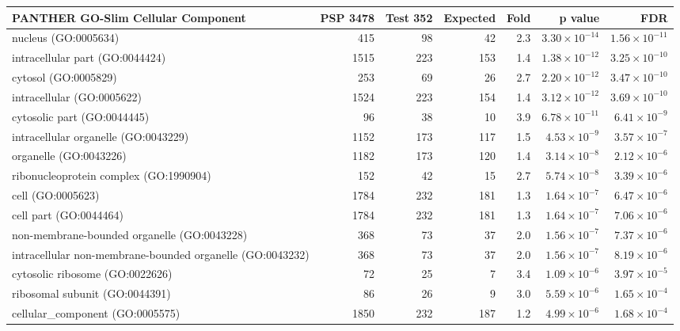 \begin{table}[ht]
\centering
\begin{adjustbox}{width=\textwidth}
\begin{tabular}{lrrrrrr}
  \hline
PANTHER GO-Slim Cellular Component & PSP 3478 & Test 352 & Expected & Fold & p value & FDR \\ 
  \hline
nucleus (GO:0005634) & 415 & 98 & 42 & 2.3 & $3.30 \times 10^{-14}$ & $1.56 \times 10^{-11}$ \\ 
  intracellular part (GO:0044424) & 1515 & 223 & 153 & 1.4 & $1.38 \times 10^{-12}$ & $3.25 \times 10^{-10}$ \\ 
  cytosol (GO:0005829) & 253 & 69 & 26 & 2.7 & $2.20 \times 10^{-12}$ & $3.47 \times 10^{-10}$ \\ 
  intracellular (GO:0005622) & 1524 & 223 & 154 & 1.4 & $3.12 \times 10^{-12}$ & $3.69 \times 10^{-10}$ \\ 
  cytosolic part (GO:0044445) & 96 & 38 & 10 & 3.9 & $6.78 \times 10^{-11}$ & $6.41 \times 10^{-9}$ \\ 
  intracellular organelle (GO:0043229) & 1152 & 173 & 117 & 1.5 & $4.53 \times 10^{-9}$ & $3.57 \times 10^{-7}$ \\ 
  organelle (GO:0043226) & 1182 & 173 & 120 & 1.4 & $3.14 \times 10^{-8}$ & $2.12 \times 10^{-6}$ \\ 
  ribonucleoprotein complex (GO:1990904) & 152 & 42 & 15 & 2.7 & $5.74 \times 10^{-8}$ & $3.39 \times 10^{-6}$ \\ 
  cell (GO:0005623) & 1784 & 232 & 181 & 1.3 & $1.64 \times 10^{-7}$ & $6.47 \times 10^{-6}$ \\ 
  cell part (GO:0044464) & 1784 & 232 & 181 & 1.3 & $1.64 \times 10^{-7}$ & $7.06 \times 10^{-6}$ \\ 
  non-membrane-bounded organelle (GO:0043228) & 368 & 73 & 37 & 2.0 & $1.56 \times 10^{-7}$ & $7.37 \times 10^{-6}$ \\ 
  intracellular non-membrane-bounded organelle (GO:0043232) & 368 & 73 & 37 & 2.0 & $1.56 \times 10^{-7}$ & $8.19 \times 10^{-6}$ \\ 
  cytosolic ribosome (GO:0022626) & 72 & 25 & 7 & 3.4 & $1.09 \times 10^{-6}$ & $3.97 \times 10^{-5}$ \\ 
  ribosomal subunit (GO:0044391) & 86 & 26 & 9 & 3.0 & $5.59 \times 10^{-6}$ & $1.65 \times 10^{-4}$ \\ 
  cellular\_component (GO:0005575) & 1850 & 232 & 187 & 1.2 & $4.99 \times 10^{-6}$ & $1.68 \times 10^{-4}$ \\ 

\end{tabular}
\end{adjustbox}
\end{table}

